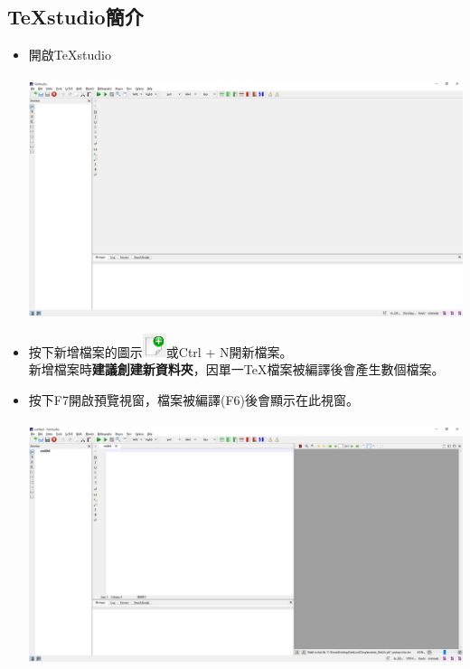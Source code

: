 \documentclass[12pt]{article}
\begin{document}
\begin{CJK*}{UTF8}{bsmi}
		\section{TeXstudio簡介}
			\begin{itemize}
				\item 開啟TeXstudio \\ \\
				\includegraphics[scale=0.33]{TS_window}
				\item 按下新增檔案的圖示\includegraphics[scale=1]{TS_newbtn}或Ctrl + N開新檔案。\\
				新增檔案時\textbf{建議創建新資料夾}，因單一TeX檔案被編譯後會產生數個檔案。
				
				\item 按下F7開啟預覽視窗，檔案被編譯(F6)後會顯示在此視窗。 \\ \\
				\includegraphics[scale=0.33]{TS_F7}
			\end{itemize}
			
		\newpage
		

\end{CJK*}
\end{document}
